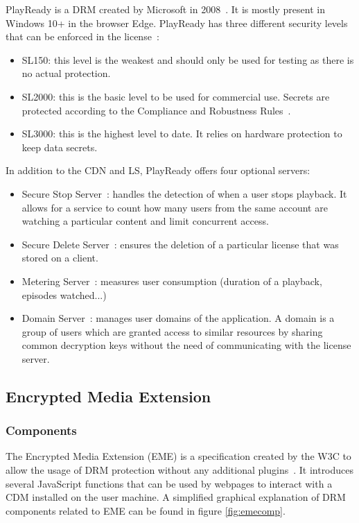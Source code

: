\documentclass[11pt, a4paper]{IEEEtran}
\begin{document}
PlayReady is a DRM created by Microsoft in 2008~\cite{playready}. It is mostly present in Windows 10+ in the browser Edge. PlayReady has three different security levels that can be enforced in the license~\cite{sl}:
\begin{itemize}
	\item SL150: this level is the weakest and should only be used for testing as there is no actual protection.
	\item SL2000: this is the basic level to be used for commercial use. Secrets are protected according to the Compliance and Robustness Rules~\cite{compliancerobustness}. 
	\item SL3000: this is the highest level to date. It relies on hardware protection to keep data secrets.
\end{itemize}

In addition to the CDN and LS, PlayReady offers four optional servers:
\begin{itemize}
	\item Secure Stop Server~\cite{securestop}: handles the detection of when a user stops playback. It allows for a service to count how many users from the same account are watching a particular content and limit concurrent access.
	\item Secure Delete Server~\cite{securedelete}: ensures the deletion of a particular license that was stored on a client.
	\item Metering Server~\cite{metering}: measures user consumption (duration of a playback, episodes watched...)
	\item Domain Server~\cite{domain}:  manages user domains of the application. A domain is a group of users which are granted access to similar resources by sharing common decryption keys without the need of communicating with the license server.
\end{itemize}

\subsection{Encrypted Media Extension}

\subsubsection{Components}

The Encrypted Media Extension (EME) is a specification created by the W3C to allow the usage of DRM protection without any additional plugins~\cite{EME}. It introduces several JavaScript functions that can be used by webpages to interact with a CDM installed on the user machine. A simplified graphical explanation of DRM components related to EME can be found in figure \ref{fig:emecomp}.
\end{document}
